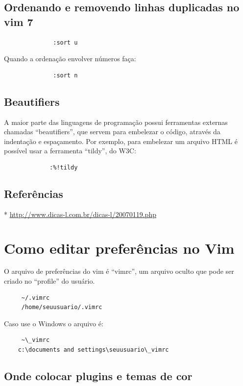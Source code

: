 \documentclass[10pt,a4paper,openany]{book}
\begin{document}
\section{Ordenando e removendo linhas duplicadas no vim 7}

\begin{verbatim}
			  :sort u
\end{verbatim}

Quando a ordenação envolver números faça:

\begin{verbatim}
			  :sort n
\end{verbatim}

\section{Beautifiers}

A maior parte das linguagens de programação possui ferramentas
externas chamadas ``beautifiers'', que servem para embelezar o código,
através da indentação e espaçamento. Por exemplo, para embelezar um
arquivo HTML é possível usar a ferramenta ``tildy'', do W3C:

\begin{verbatim}
			 :%!tildy
\end{verbatim}

\section{Referências}
* \url{http://www.dicas-l.com.br/dicas-l/20070119.php}

\chapter{Como editar preferências no Vim}\label{cha:Como editar preferências no Vim}
O arquivo de preferências do vim é ``vimrc'', um arquivo oculto que
pode ser criado no ``profile'' do usuário.

\begin{verbatim}
     ~/.vimrc
     /home/seuusuario/.vimrc
\end{verbatim}

Caso use o Windows o arquivo é:

\begin{verbatim}
     ~\_vimrc
    c:\documents and settings\seuusuario\_vimrc
\end{verbatim}

\section{Onde colocar plugins e temas de cor}
\label{Onde colocar plugins e temas de cor}
\end{document}
